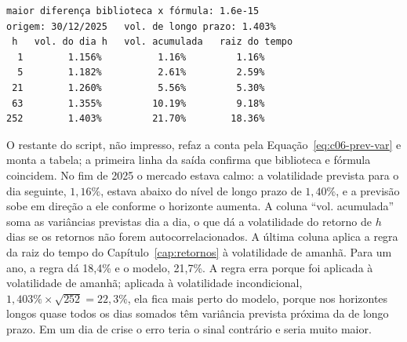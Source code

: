 \Needspace{32mm}

\Needspace{38mm}
\begin{lstlisting}[style=saida]
maior diferença biblioteca x fórmula: 1.6e-15
origem: 30/12/2025   vol. de longo prazo: 1.403%
 h   vol. do dia h   vol. acumulada   raiz do tempo
  1        1.156%          1.16%         1.16%
  5        1.182%          2.61%         2.59%
 21        1.260%          5.56%         5.30%
 63        1.355%         10.19%         9.18%
252        1.403%         21.70%        18.36%
\end{lstlisting}

O restante do script, não impresso, refaz a conta pela Equação~\eqref{eq:c06-prev-var} e monta a tabela; a primeira linha da saída confirma que biblioteca e fórmula coincidem. No fim de 2025 o mercado estava calmo: a volatilidade prevista para o dia seguinte, $1,16\%$, estava abaixo do nível de longo prazo de $1,40\%$, e a previsão sobe em direção a ele conforme o horizonte aumenta. A coluna ``vol. acumulada'' soma as variâncias previstas dia a dia, o que dá a volatilidade do retorno de $h$ dias se os retornos não forem autocorrelacionados. A última coluna aplica a regra da raiz do tempo do Capítulo~\ref{cap:retornos} à volatilidade de amanhã. Para um ano, a regra dá 18,4\% e o modelo, 21,7\%. A regra erra porque foi aplicada à volatilidade de amanhã; aplicada à volatilidade incondicional, $1,403\% \times \sqrt{252} = 22,3\%$, ela fica mais perto do modelo, porque nos horizontes longos quase todos os dias somados têm variância prevista próxima da de longo prazo. Em um dia de crise o erro teria o sinal contrário e seria muito maior.



